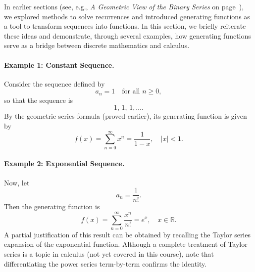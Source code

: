 \documentclass[docmute]{article}
\begin{document}
In earlier sections (see, e.g., \emph{A Geometric View of the Binary Series} on page~\pageref{par:gf-binary-series}), we explored methods to solve recurrences and introduced generating functions as a tool to transform sequences into functions. In this section, we briefly reiterate these ideas and demonstrate, through several examples, how generating functions serve as a bridge between discrete mathematics and calculus.

\paragraph{Example 1: Constant Sequence.}  
Consider the sequence defined by
\[
a_n=1 \quad \text{for all } n\ge0,
\]
so that the sequence is
\[
1,\,1,\,1,\dots.
\]
By the geometric series formula (proved earlier), its generating function is given by
\[
f(x)=\sum_{n=0}^{\infty} x^n=\frac{1}{1-x}, \quad |x|<1.
\]

\paragraph{Example 2: Exponential Sequence.}  
Now, let
\[
a_n=\frac{1}{n!}.
\]
Then the generating function is
\[
f(x)=\sum_{n=0}^{\infty} \frac{x^n}{n!}=e^x, \quad x\in\mathbb{R}.
\]
A partial justification of this result can be obtained by recalling the Taylor series expansion of the exponential function. Although a complete treatment of Taylor series is a topic in calculus (not yet covered in this course), note that differentiating the power series term-by-term confirms the identity.
\end{document}
